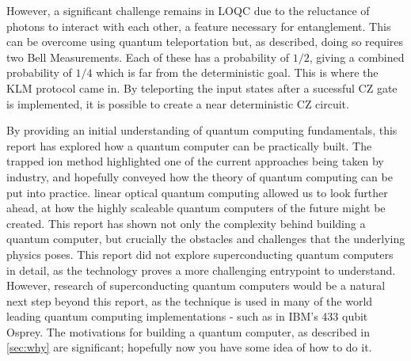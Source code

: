 However, a significant challenge remains in LOQC due to the reluctance of photons to interact with each other, a feature necessary for entanglement. This can be overcome using quantum teleportation but, as described, doing so requires two Bell Measurements. Each of these has a probability of $1/2$, giving a combined probability of $1/4$ which is far from the deterministic goal. This is where the KLM protocol came in. By teleporting the input states after a sucessful CZ gate is implemented, it is possible to create a near deterministic CZ circuit.

By providing an initial understanding of quantum computing fundamentals, this report has explored how a quantum computer can be practically built. The trapped ion method highlighted one of the current approaches being taken by industry, and hopefully conveyed how the theory of quantum computing can be put into practice. linear optical quantum computing allowed us to look further ahead, at how the highly scaleable quantum computers of the future might be created. This report has shown not only the complexity behind building a quantum computer, but crucially the obstacles and challenges that the underlying physics poses. This report did not explore superconducting quantum computers in detail, as the technology proves a more challenging entrypoint to understand. However, research of superconducting quantum computers would be a natural next step beyond this report, as the technique is used in many of the world leading quantum computing implementations - such as in IBM's 433 qubit Osprey. The motivations for building a quantum computer, as described in \cref{sec:why} are significant; hopefully now you have some idea of how to do it.